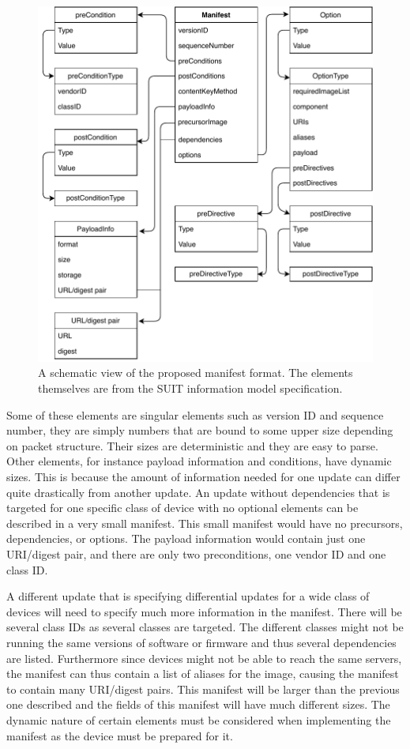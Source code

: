 \documentclass[0-thesis.tex]{subfiles}
\begin{document}
\begin{figure}
    \caption{A schematic view of the proposed manifest format. The elements themselves are from the SUIT information model specification.}
    \label{fig:manifest-format}
    \includegraphics{images/manifest-format.pdf}
\end{figure}

Some of these elements are singular elements such as version ID and sequence number, they
are simply numbers that are bound to some upper size depending on packet structure. Their
sizes are deterministic and they are easy to parse. Other elements, for instance payload
information and conditions, have dynamic sizes. This is because the amount of information
needed for one update can differ quite drastically from another update. An update without
dependencies that is targeted for one specific class of device with no optional elements
can be described in a very small manifest. This small manifest would have no precursors,
dependencies, or options. The payload information would contain just one URI/digest pair,
and there are only two preconditions, one vendor ID and one class ID.

A different update that is specifying differential updates for a wide class of devices
will need to specify much more information in the manifest. There will be several class
IDs as several classes are targeted. The different classes might not be running the same
versions of software or firmware and thus several dependencies are listed. Furthermore
since devices might not be able to reach the same servers, the manifest can thus contain a
list of aliases for the image, causing the manifest to contain many URI/digest pairs. This
manifest will be larger than the previous one described and the fields of this manifest
will have much different sizes. The dynamic nature of certain elements must be considered
when implementing the manifest as the device must be prepared for it. 
\end{document}
